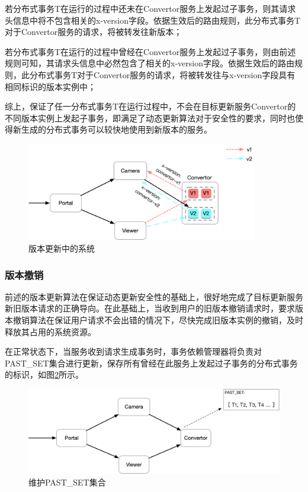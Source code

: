 \documentclass[macfonts,master]{njuthesis}
\begin{document}
若分布式事务T在运行的过程中还未在Convertor服务上发起过子事务，则其请求头信息中将不包含相关的x-version字段。依据生效后的路由规则，此分布式事务T对于Convertor服务的请求，将被转发往新版本；

若分布式事务T在运行的过程中曾经在Convertor服务上发起过子事务，则由前述规则可知，其请求头信息中必然包含了相关的x-version字段。依据生效后的路由规则，此分布式事务T对于Convertor服务的请求，将被转发往与x-version字段具有相同标识的版本实例中；

综上，保证了任一分布式事务T在运行过程中，不会在目标更新服务Convertor的不同版本实例上发起子事务，即满足了动态更新算法对于安全性的要求，同时也使得新生成的分布式事务可以较快地使用到新版本的服务。

\begin{figure}[!htbp]
  \centering
  \includegraphics[width= 0.9\textwidth]{image/convertor_shift_v1v2.png}
  \caption{版本更新中的系统}
  \label{fig:convertor_shift_v1v2}
\end{figure}

\subsubsection{版本撤销}
前述的版本更新算法在保证动态更新安全性的基础上，很好地完成了目标更新服务新旧版本请求的正确导向。在此基础上，当收到用户的旧版本撤销请求时，要求版本撤销算法在保证用户请求不会出错的情况下，尽快完成旧版本实例的撤销，及时释放其占用的系统资源。

在正常状态下，当服务收到请求生成事务时，事务依赖管理器将负责对PAST\_SET集合进行更新，保存所有曾经在此服务上发起过子事务的分布式事务的标识，如图\ref{fig:normal_past_set}所示。

\begin{figure}[!htbp]
  \centering
  \includegraphics[width= 1.0\textwidth]{image/normal_past_set.png}
  \caption{维护PAST\_SET集合}
  \label{fig:normal_past_set}
\end{figure}
\end{document}
